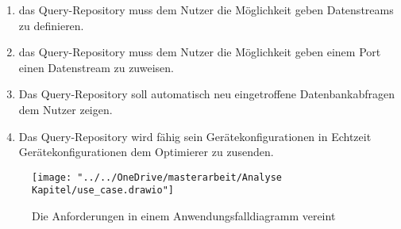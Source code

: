 \begin{enumerate}
\item  das Query-Repository muss dem Nutzer die Möglichkeit geben Datenstreams zu definieren.
\label{21}

\item  das Query-Repository muss dem Nutzer die Möglichkeit geben einem Port einen Datenstream zu zuweisen.
\label{22}


\item  Das Query-Repository soll automatisch neu eingetroffene Datenbankabfragen dem Nutzer zeigen.\label{211}


\item  Das Query-Repository wird fähig sein Gerätekonfigurationen in Echtzeit Gerätekonfigurationen dem Optimierer zu zusenden. \label{212}

  
\end{enumerate}

\begin{figure}
	\centering
	\texttt{[image: "../../OneDrive/masterarbeit/Analyse Kapitel/use\_case.drawio"]}
	\caption{Die Anforderungen in einem Anwendungsfalldiagramm vereint}
	\label{fig:usecase}
\end{figure}


